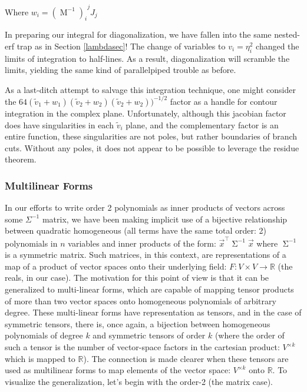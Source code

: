 \documentclass[10pt,letterpaper]{article}
\begin{document}
Where $w_i = {(\operatorname{M}^{-1})_i}^j J_j$
\vspace{1pc}

In preparing our integral for diagonalization, we have fallen into the same nested-erf trap as in Section \ref{lambdasec}! The change of variables to $v_i = \eta_i^2$ changed the limits of integration to half-lines. As a result, diagonalization will scramble the limits, yielding the same kind of parallelpiped trouble as before.

As a last-ditch attempt to salvage this integration technique, one might consider the $64 (\tilde{v}_1 + w_1)(\tilde{v}_2 + w_2)(\tilde{v}_2 + w_2))^{-1/2}$ factor as a handle for contour integration in the complex plane. Unfortunately, although this jacobian factor does have singularities in each $\tilde{v}_i$ plane, and the complementary factor is an entire function, these singularities are not poles, but rather boundaries of branch cuts. Without any poles, it does not appear to be possible to leverage the residue theorem.

\subsubsection{Multilinear Forms}

In our efforts to write order 2 polynomials as inner products of vectors across some $\Sigma^{-1}$ matrix, we have been making implicit use of a bijective relationship between quadratic homogeneous (all terms have the same total order: 2) polynomials in $n$ variables and inner products of the form: $\vec{x}^\top \operatorname{\Sigma}^{-1} \vec{x}$ where $\operatorname{\Sigma}^{-1}$ is a symmetric matrix. Such matrices, in this context, are representations of a map of a product of vector spaces onto their underlying field: $F: V \times V \rightarrow \mathbb{R}$ (the reals, in our case). The motivation for this point of view is that it can be generalized to multi-linear forms, which are capable of mapping tensor products of more than two vector spaces onto homogeneous polynomials of arbitrary degree. These multi-linear forms have representation as tensors, and in the case of symmetric tensors, there is, once again, a bijection between homogeneous polynomials of degree $k$ and symmetric tensors of order $k$ (where the order of such a tensor is the number of vector-space factors in the cartesian product: $V^{\times k}$ which is mapped to $\mathbb{R}$). The connection is made clearer when these tensors are used as multilinear forms to map elements of the vector space: $V^{\times k}$ onto $\mathbb{R}$. To visualize the generalization, let's begin with the order-2 (the matrix case).
\end{document}

